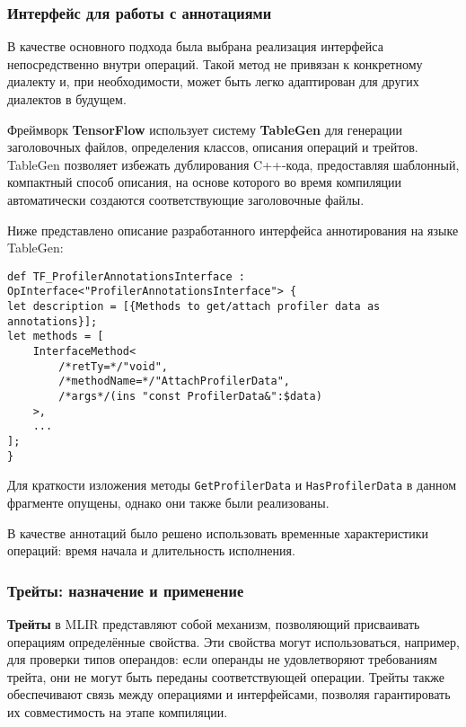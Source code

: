 \subsubsection{Интерфейс для работы с аннотациями}

В качестве основного подхода была выбрана реализация интерфейса непосредственно внутри операций. Такой метод не привязан к конкретному диалекту и, при необходимости, может быть легко адаптирован для других диалектов в будущем.

Фреймворк \textbf{TensorFlow} использует систему \textbf{TableGen} для генерации заголовочных файлов, определения классов, описания операций и трейтов. TableGen позволяет избежать дублирования C++-кода, предоставляя шаблонный, компактный способ описания, на основе которого во время компиляции автоматически создаются соответствующие заголовочные файлы.

Ниже представлено описание разработанного интерфейса аннотирования на языке TableGen:

\begin{lstlisting}[caption={Описание интерфейса аннотирования на языке TableGen}]
def TF_ProfilerAnnotationsInterface : OpInterface<"ProfilerAnnotationsInterface"> {
let description = [{Methods to get/attach profiler data as annotations}];
let methods = [
    InterfaceMethod<
        /*retTy=*/"void",
        /*methodName=*/"AttachProfilerData",
        /*args*/(ins "const ProfilerData&":$data)
    >,
    ...
];
}
\end{lstlisting}

Для краткости изложения методы \texttt{GetProfilerData} и \texttt{HasProfilerData} в данном фрагменте опущены, однако они также были реализованы.

В качестве аннотаций было решено использовать временные характеристики операций: время начала и длительность исполнения.

\subsubsection{Трейты: назначение и применение}

\textbf{Трейты} в MLIR представляют собой механизм, позволяющий присваивать операциям определённые свойства. Эти свойства могут использоваться, например, для проверки типов операндов: если операнды не удовлетворяют требованиям трейта, они не могут быть переданы соответствующей операции. Трейты также обеспечивают связь между операциями и интерфейсами, позволяя гарантировать их совместимость на этапе компиляции.


